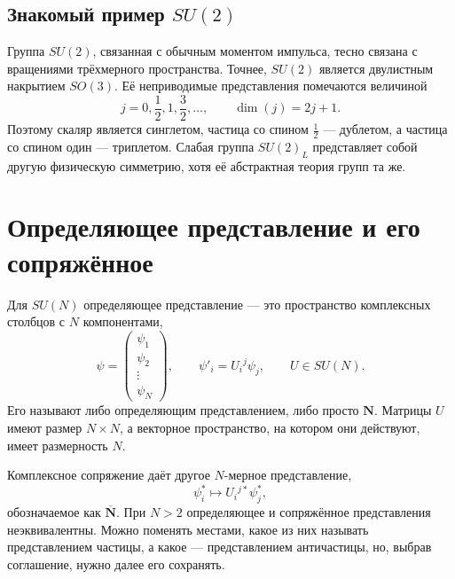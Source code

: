 \subsection{Знакомый пример \texorpdfstring{\(SU(2)\)}{SU(2)}}

Группа \(SU(2)\), связанная с обычным моментом импульса, тесно связана с вращениями трёхмерного пространства. Точнее, \(SU(2)\) является двулистным накрытием \(SO(3)\). Её неприводимые представления помечаются величиной
\begin{equation}
j=0,\frac12,1,\frac32,\ldots,
\qquad
\dim(j)=2j+1.
\label{eq:l10-su2-spins}
\end{equation}
Поэтому скаляр является синглетом, частица со спином \(\tfrac12\) — дублетом, а частица со спином один — триплетом. Слабая группа \(SU(2)_L\) представляет собой другую физическую симметрию, хотя её абстрактная теория групп та же.

\section{Определяющее представление и его сопряжённое}

Для \(SU(N)\) определяющее представление — это пространство комплексных столбцов с \(N\) компонентами,
\begin{equation}
\psi=
\begin{pmatrix}
\psi_1\\
\psi_2\\
\vdots\\
\psi_N
\end{pmatrix},
\qquad
\psi'_i=U_i{}^j\psi_j,
\qquad
U\in SU(N).
\label{eq:l10-defining}
\end{equation}
Его называют либо определяющим представлением, либо просто \(\mathbf N\). Матрицы \(U\) имеют размер \(N\times N\), а векторное пространство, на котором они действуют, имеет размерность \(N\).

Комплексное сопряжение даёт другое \(N\)-мерное представление,
\begin{equation}
\psi_i^*\longmapsto U_i{}^{j*}\psi_j^*,
\label{eq:l10-conjugate}
\end{equation}
обозначаемое как \(\overline{\mathbf N}\). При \(N>2\) определяющее и сопряжённое представления неэквивалентны. Можно поменять местами, какое из них называть представлением частицы, а какое — представлением античастицы, но, выбрав соглашение, нужно далее его сохранять.

\begin{classroomqa}
\end{classroomqa}

